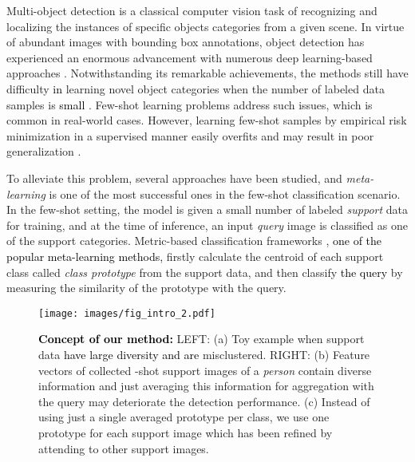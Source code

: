 \documentclass[10pt,twocolumn,letterpaper]{article}
\newcommand{\nj}[1]{\textcolor{black}{#1}}
\begin{document}
Multi-object detection is a classical computer vision task of recognizing and localizing the instances of specific objects categories from a given scene. 
In virtue of abundant images with bounding box annotations, object detection has experienced an enormous advancement with numerous deep learning-based approaches \cite{ren2015faster, liu2016ssd, redmon2016you}.
Notwithstanding its remarkable achievements, the methods still have difficulty \nj{in} learning novel object categories when the number of labeled data samples is \nj{small} \cite{sohn2020simple, li2020overcoming}. 
Few-shot learning problems address such issues, which is common in real-world cases. 
However, learning few-shot samples by empirical risk minimization in a supervised manner easily overfits and may result in poor generalization \cite{bousquet2003introduction, wang2020generalizing}.

To alleviate this problem, several approaches have been studied, and \textit{meta-learning} is one of the most successful ones in the few-shot classification scenario. In the few-shot setting, the model is given a small number of labeled \emph{support} data for training, and at the time of inference, an input \emph{query} image is classified as one of the support categories. Metric-based classification frameworks \cite{vinyals2016matching, yang2021free, snell2017prototypical, li2019few, sung2018learning}, \nj{one of the popular meta-learning methods,} firstly calculate the centroid of each support class called \emph{class prototype} from the support data, and then classify \nj{the query} by measuring the similarity of the prototype with the query.
\begin{figure*}
\begin{center}
\texttt{[image: images/fig\_intro\_2.pdf]}
\vspace{-0.70cm}
\end{center}
  \caption{\textbf{\nj{Concept of our method:}} LEFT: (a) Toy example when support data \nj{have large diversity and are} misclustered. RIGHT: (b) Feature vectors of collected -shot support images of a \textit{person} contain diverse information and just averaging this information for aggregation with the query may deteriorate the detection performance. (c) Instead of using just a single averaged prototype per class, we use one prototype for each support image which has been refined by attending to other support images.}  \vspace{-0.20cm}
\label{fig:intro}
\end{figure*}
\end{document}
